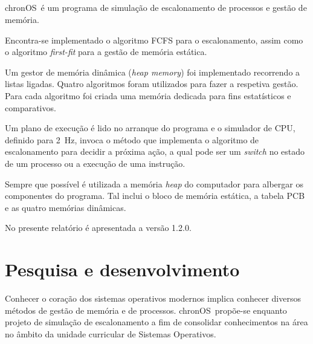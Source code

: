 \documentclass[10pt,oneside]{estiloUBI}
\newcommand{\chronOS}{\textsf{chronOS}}
\begin{document}
	\onehalfspacing
	
	
	
	\pagestyle{fancy}
	
	\newpage
	
	\section*{}
	\vspace{0.5cm}
	
	\chronOS~é um programa de simulação de escalonamento de processos e gestão de memória.
	
	Encontra-se implementado o algoritmo FCFS para o escalonamento, assim como o algoritmo \textit{first-fit} para a gestão de memória estática.
	
	Um gestor de memória dinâmica (\textit{heap memory}) foi implementado recorrendo a listas ligadas. Quatro algoritmos foram utilizados para fazer a respetiva gestão. Para cada algoritmo foi criada uma memória dedicada para fins estatísticos e comparativos.
	
	Um plano de execução é lido no arranque do programa e o simulador de CPU, definido para \SI{2}{\hertz}, invoca o método que implementa o algoritmo de escalonamento para decidir a próxima ação, a qual pode ser um \textit{switch} no estado de um processo ou a execução de uma instrução.
	
	Sempre que possível é utilizada a memória \textit{heap} do computador para albergar os componentes do programa. Tal inclui o bloco de memória estática, a tabela PCB e as quatro memórias dinâmicas.
	
	No presente relatório é apresentada a versão 1.2.0.

	
	\tableofcontents
	\listoffigures
	\mainmatter


	
	\chapter{Pesquisa e desenvolvimento}
	\label{sec:dev}
	
	Conhecer o coração dos sistemas operativos modernos implica conhecer diversos métodos de gestão de memória e de processos. \chronOS~propõe-se enquanto projeto de simulação de escalonamento a fim de consolidar conhecimentos na área no âmbito da unidade curricular de Sistemas Operativos.
	
\end{document}
